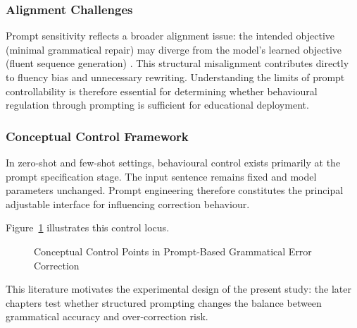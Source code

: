 \subsubsection{Alignment Challenges}

Prompt sensitivity reflects a broader alignment issue: the intended objective (minimal grammatical repair) may diverge from the model's learned objective (fluent sequence generation) \cite{NEURIPS2020_1457c0d6}. This structural misalignment contributes directly to fluency bias and unnecessary rewriting. Understanding the limits of prompt controllability is therefore essential for determining whether behavioural regulation through prompting is sufficient for educational deployment.

\subsubsection*{Conceptual Control Framework}

In zero-shot and few-shot settings, behavioural control exists primarily at the prompt specification stage. The input sentence remains fixed and model parameters unchanged. Prompt engineering therefore constitutes the principal adjustable interface for influencing correction behaviour.

Figure~\ref{fig:prompt_pipeline} illustrates this control locus.

\begin{figure}[htbp]
\centering
{}
\caption{Conceptual Control Points in Prompt-Based Grammatical Error Correction}
\label{fig:prompt_pipeline}
\end{figure}

This literature motivates the experimental design of the present study: the later chapters test whether structured prompting changes the balance between grammatical accuracy and over-correction risk.

